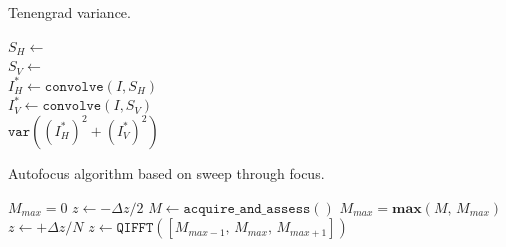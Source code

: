 %
\begin{algorithm}
    \caption{Tenengrad variance.}
    \label{alg:TENV}
    \newsavebox\sobelh
    \newsavebox\sobelv
    \begin{algorithmic}
        \State $S_H \gets $ \usebox{\sobelh}  \\
        \State $S_V \gets $ \usebox{\sobelv}  \\
        \vspace{0.5em}
        \State $I^{*}_H \gets \texttt{convolve}(I, S_H)$ \\
        \vspace{-1em}
        \State $I^{*}_V \gets \texttt{convolve}(I, S_V)$ \\
        \vspace{0.5em}
        \Return $\texttt{var}\left((I^{*}_H)^2 + (I^{*}_V)^2\right)$
    \end{algorithmic}
\end{algorithm}
%

%
\begin{algorithm}
    \caption{Autofocus algorithm based on sweep through focus.}
    \label{alg:sweep_af}
    \begin{algorithmic}
        \State $M_{max} = 0$
        \State $z \gets -\Delta z/2$
            \State $M \gets \texttt{acquire\_and\_assess}()$
            \State $M_{max} = \textbf{max}(M, \,M_{max})$
            \State $z \gets +\Delta z/N$
        \EndFor
        \State $z \gets \texttt{QIFFT}([M_{max - 1}, \,M_{max}, \,M_{max + 1}])$ 
    \end{algorithmic}
\end{algorithm}
%




